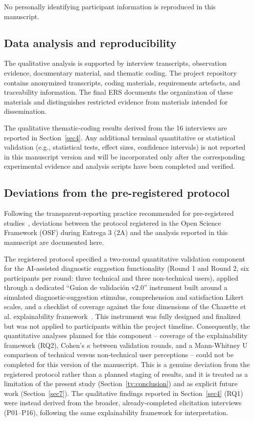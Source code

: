 \documentclass[pdflatex,sn-mathphys-num,Numbered]{sn-jnl}
\begin{document}
No personally identifying participant information is reproduced in this manuscript.

\subsection{Data analysis and reproducibility}\label{subsec8}

The qualitative analysis is supported by interview transcripts, observation evidence, documentary material, and thematic coding. The project repository contains anonymized transcripts, coding materials, requirements artefacts, and traceability information. The final ERS documents the organization of these materials and distinguishes restricted evidence from materials intended for dissemination.

The qualitative thematic-coding results derived from the 16 interviews are reported in Section~\ref{sec4}. Any additional terminal quantitative or statistical validation (e.g., statistical tests, effect sizes, confidence intervals) is not reported in this manuscript version and will be incorporated only after the corresponding experimental evidence and analysis scripts have been completed and verified.

\subsection{Deviations from the pre-registered protocol}\label{subsec8b}

Following the transparent-reporting practice recommended for pre-registered studies~\cite{nosek2018}, deviations between the protocol registered in the Open Science Framework (OSF) during Entrega 3 (2A) and the analysis reported in this manuscript are documented here.

The registered protocol specified a two-round quantitative validation component for the AI-assisted diagnostic suggestion functionality (Round 1 and Round 2, six participants per round: three technical and three non-technical users), applied through a dedicated ``Guion de validación v2.0'' instrument built around a simulated diagnostic-suggestion stimulus, comprehension and satisfaction Likert scales, and a checklist of coverage against the four dimensions of the Chazette et al. explainability framework~\cite{chazette2020,chazette2021,chazette2022}. This instrument was fully designed and finalized but was not applied to participants within the project timeline. Consequently, the quantitative analyses planned for this component -- coverage of the explainability framework (RQ2), Cohen's $\kappa$ between validation rounds, and a Mann-Whitney U comparison of technical versus non-technical user perceptions -- could not be completed for this version of the manuscript. This is a genuine deviation from the registered protocol rather than a planned staging of results, and it is treated as a limitation of the present study (Section~\ref{tv:conclusion}) and as explicit future work (Section~\ref{sec7}). The qualitative findings reported in Section~\ref{sec4} (RQ1) were instead derived from the broader, already-completed elicitation interviews (P01--P16), following the same explainability framework for interpretation.
\end{document}
